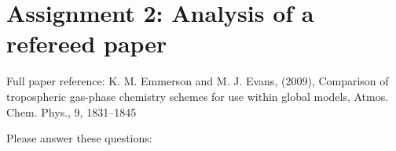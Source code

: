 \documentclass[11pt]{article}
\begin{document}
\section*{Assignment 2: Analysis of a refereed paper}

Full paper reference: K. M. Emmerson and M. J. Evans, (2009), Comparison of tropospheric gas-phase chemistry schemes for use within global models, Atmos. Chem. Phys., 9, 1831--1845

\vspace{5mm}
\begin{center}
     \par
\end{center}
\vspace{5mm}

Please answer these questions:
\end{document}
